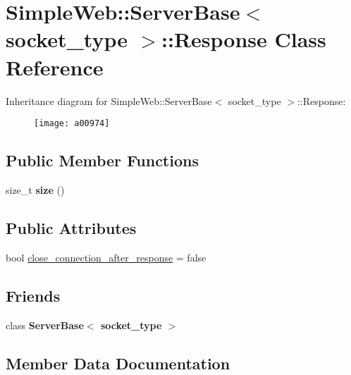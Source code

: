 \hypertarget{a00974}{}\section{Simple\+Web\+:\+:Server\+Base$<$ socket\+\_\+type $>$\+:\+:Response Class Reference}
\label{a00974}
Inheritance diagram for Simple\+Web\+:\+:Server\+Base$<$ socket\+\_\+type $>$\+:\+:Response\+:\begin{figure}[H]
\begin{center}
\leavevmode
\texttt{[image: a00974]}
\end{center}
\end{figure}
\subsection*{Public Member Functions}
\begin{DoxyCompactItemize}
\item 
\mbox{\label{a00974_af666efb61621d70c16e3d6a6c419271d}} 
size\+\_\+t {\bfseries size} ()
\end{DoxyCompactItemize}
\subsection*{Public Attributes}
\begin{DoxyCompactItemize}
\item 
bool \hyperlink{a00974_a2818b4f3c577ff1f4067bb1c62640c15}{close\+\_\+connection\+\_\+after\+\_\+response} = false
\end{DoxyCompactItemize}
\subsection*{Friends}
\begin{DoxyCompactItemize}
\item 
\mbox{\label{a00974_a01d54a7e16ca437c98ec571deca98dfc}} 
class {\bfseries Server\+Base$<$ socket\+\_\+type $>$}
\end{DoxyCompactItemize}


\subsection{Member Data Documentation}
\mbox{\label{a00974_a2818b4f3c577ff1f4067bb1c62640c15}} 
